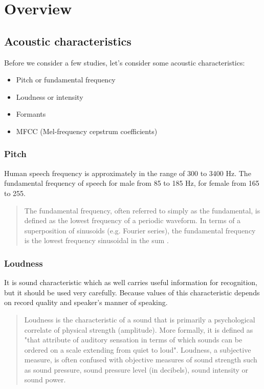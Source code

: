 \documentclass[14pt]{extarticle}
\begin{document}
\section{Overview}
\subsection{Acoustic characteristics}
Before we consider a few studies, let's consider some acoustic characteristics:
\begin{itemize}
	\item Pitch or fundamental frequency
	\item Loudness or intensity
	\item Formants
	\item MFCC (Mel-frequency cepstrum coefficients)
\end{itemize}

\subsubsection{Pitch}
Human speech frequency is approximately in the range of 300 to 3400 Hz. The fundamental frequency of speech for male from 85 to 185 Hz, for female from 165 to 255.
\begin{quote}
The fundamental frequency, often referred to simply as the fundamental, is defined as the lowest frequency of a periodic waveform. In terms of a superposition of sinusoids (e.g. Fourier series), the fundamental frequency is the lowest frequency sinusoidal in the sum \cite{wiki1}.
\end{quote}

\subsubsection{Loudness}
It is sound characteristic which as well carries useful information for recognition, but it should be used very carefully. Because values of this characteristic depends on record quality and speaker's manner of speaking.
\begin{quote}
Loudness is the characteristic of a sound that is primarily a psychological correlate of physical strength (amplitude). More formally, it is defined as "that attribute of auditory sensation in terms of which sounds can be ordered on a scale extending from quiet to loud".
Loudness, a subjective measure, is often confused with objective measures of sound strength such as sound pressure, sound pressure level (in decibels), sound intensity or sound power.\cite{wiki_loudness}
\end{quote}
\end{document}
